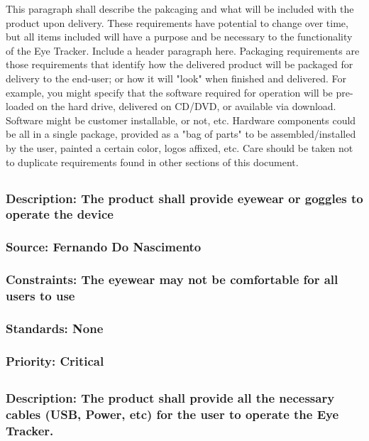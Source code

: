 This paragraph shall describe the pakcaging and what will be included with the product upon delivery. These requirements have potential to change over time, but all items included will have a purpose and be necessary to the functionality of the Eye Tracker.
Include a header paragraph here. Packaging requirements are those requirements that identify how the delivered product will be packaged for delivery to the end-user; or how it will "look" when finished and delivered. For example, you might specify that the software required for operation will be pre-loaded on the hard drive, delivered on CD/DVD, or available via download. Software might be customer installable, or not, etc. Hardware components could be all in a single package, provided as a "bag of parts" to be assembled/installed by the user, painted a certain color, logos affixed, etc. Care should be taken not to duplicate requirements found in other sections of this document.

\subsection{\bfEyewear}
\subsubsection{Description: The product shall provide eyewear or goggles to operate the device}
\subsubsection{Source: Fernando Do Nascimento}
\subsubsection{Constraints: The eyewear may not be comfortable for all users to use}
\subsubsection{Standards: None}
\subsubsection{Priority: Critical}

\subsection{\bfCables}
\subsubsection{Description: The product shall provide all the necessary cables (USB, Power, etc) for the user to operate the Eye Tracker.}
